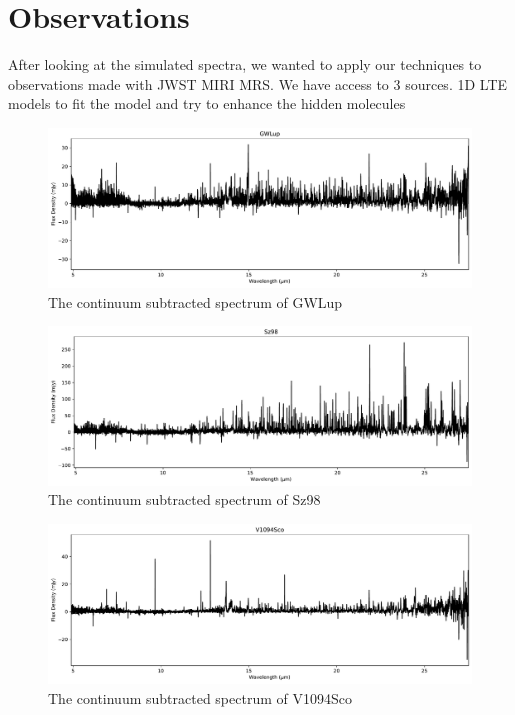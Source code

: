 \documentclass[twoside, single, authoryear, semicolon]{lion-msc}
\newcommand{\3}{$_3$}
\newcommand{\2}{$_2$}
\begin{document}
\section{Observations}
After looking at the simulated spectra, we wanted to apply our techniques to observations made with JWST MIRI MRS. We have access to 3 sources. 
1D LTE models to fit the model and try to enhance the hidden molecules
\begin{figure}[!ht]
    \centering
    \includegraphics[width=\linewidth]{Figures/FullSpectrum_GWLup.pdf}
    \caption{The continuum subtracted spectrum of GWLup}
    \label{fig:GWLup}
\end{figure}
\begin{figure}[!ht]
    \centering
    \includegraphics[width=\linewidth]{Figures/FullSpectrum_Sz98.pdf}
    \caption{The continuum subtracted spectrum of Sz98}
    \label{fig:Sz98}
\end{figure}
\begin{figure}[!ht]
    \centering
    \includegraphics[width=\linewidth]{Figures/FullSpectrum_V1094Sco.pdf}
    \caption{The continuum subtracted spectrum of V1094Sco}
    \label{fig:V1094Sco}
\end{figure}
\end{document}
